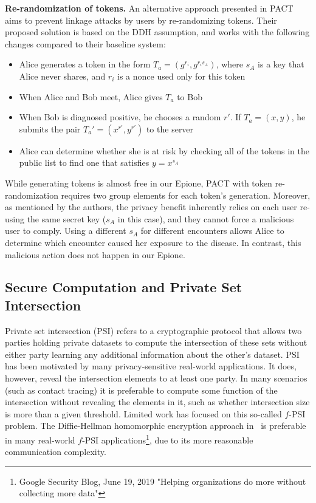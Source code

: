 \documentclass[11pt]{article} %
\newcommand{\dect}{\textsf{Epione}\xspace}
\newcommand{\fpsi}{$f$-PSI\xspace}
\begin{document}
{	\textbf{Re-randomization of tokens.} An alternative approach presented in PACT~\cite{chan2020pact} aims to prevent linkage attacks by users by re-randomizing tokens. Their proposed solution is based on the DDH assumption, and works with the following changes compared to their baseline system:
	\begin{itemize} 
		\item Alice generates a token in the form $T_a = (g^{r_i}, g^{r_i s_A})$, where $s_A$ is a key that Alice never shares, and $r_i$ is a nonce used only for this token
		\item When Alice and Bob meet, Alice gives $T_a$ to Bob
		\item When Bob is diagnosed positive, he chooses a random $r'$. If $T_a = (x, y)$, he submits the pair $T_a' = (x^{r'}, y^{r'})$ to the server
		\item Alice can determine whether she is at risk by checking all of the tokens in the public list to find one that satisfies $y=x^{s_A}$
	\end{itemize}
	
	While generating tokens is almost free in our \dect, PACT with token re-randomization requires two group elements for each token's generation. Moreover, as mentioned by the authors, the privacy benefit inherently relies on each user re-using the same secret key ($s_A$ in this case), and they cannot force a malicious user to comply. Using a different $s_A$ for different encounters allows Alice to determine which encounter caused her exposure to the disease. In contrast, this malicious action does not happen in our \dect.
	
}
\subsection{Secure Computation and Private Set Intersection}

Private set intersection (PSI) refers to a cryptographic protocol that allows two parties holding private datasets to compute the intersection of these sets without either party learning any additional information about the other's dataset. PSI has been motivated by many privacy-sensitive real-world applications. It does, however, reveal the intersection elements to at least one party. In many scenarios (such as contact tracing) it is preferable to compute some function of the intersection without revealing the elements in it, such as whether intersection size is more than a given threshold. Limited work has focused on this so-called \fpsi problem.  The Diffie-Hellman homomorphic encryption approach in~\cite{EPRINT:IKNPRSSSY19} is preferable in many real-world \fpsi applications\footnote{Google Security Blog, June 19, 2019 "Helping organizations do more without collecting more data"}, due to its more reasonable communication complexity.
\end{document}
